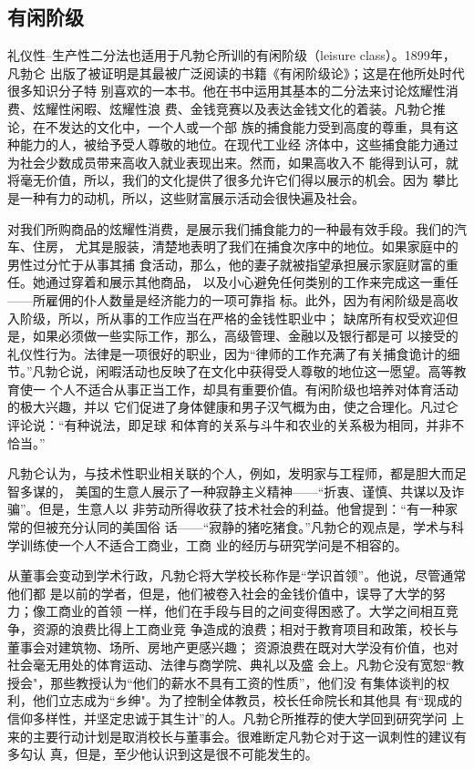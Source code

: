 \subsection{有闲阶级}

礼仪性--生产性二分法也适用于凡勃仑所训的有闲阶级（leisure class）。1899年，凡勃仑
出版了被证明是其最被广泛阅读的书籍《有闲阶级论》；这是在他所处时代很多知识分子特
别喜欢的一本书。他在书中运用其基本的二分法来讨论炫耀性消费、炫耀性闲暇、炫耀性浪
费、金钱竞赛以及表达金钱文化的着装。凡勃仑推论，在不发达的文化中，一个人或一个部
族的捕食能力受到高度的尊重，具有这种能力的人，被给予受人尊敬的地位。在现代工业经
济体中，这些捕食能力通过为社会少数成员带来高收入就业表现出来。然而，如果高收入不
能得到认可，就将毫无价值，所以，我们的文化提供了很多允许它们得以展示的机会。因为
攀比是一种有力的动机，所以，这些财富展示活动会很快遍及社会。

对我们所购商品的炫耀性消费，是展示我们捕食能力的一种最有效手段。我们的汽车、住房，
尤其是服装，清楚地表明了我们在捕食次序中的地位。如果家庭中的男性过分忙于从事其捕
食活动，那么，他的妻子就被指望承担展示家庭财富的重任。她通过穿着和展示其他商品，
以及小心避免任何类别的工作来完成这一重任——所雇佣的仆人数量是经济能力的一项可靠指
标。此外，因为有闲阶级是高收入阶级，所以，所从事的工作应当在严格的金钱性职业中；
缺席所有权受欢迎但是，如果必须做一些实际工作，那么，高级管理、金融以及银行都是可
以接受的礼仪性行为。法律是一项很好的职业，因为“律师的工作充满了有关捕食诡计的细
节。”凡勃仑说，闲暇活动也反映了在文化中获得受人尊敬的地位这一愿望。高等教育使一
个人不适合从事正当工作，却具有重要价值。有闲阶级也培养对体育活动的极大兴趣，并以
它们促进了身体健康和男子汉气概为由，使之合理化。凡过仑评论说：“有种说法，即足球
和体育的关系与斗牛和农业的关系极为相同，并非不恰当。”

凡勃仑认为，与技术性职业相关联的个人，例如，发明家与工程师，都是胆大而足智多谋的，
美国的生意人展示了一种寂静主义精神——“折衷、谨慎、共谋以及诈骗”。但是，生意人以
非劳动所得收获了技术社会的利益。他曾提到：“有一种家常的但被充分认同的美国俗
话——“寂静的猪吃猪食。”凡勃仑的观点是，学术与科学训练使一个人不适合工商业，工商
业的经历与研究学问是不相容的。

从董事会变动到学术行政，凡勃仑将大学校长称作是“学识首领”。他说，尽管通常他们都
是以前的学者，但是，他们被卷入社会的金钱价值中，误导了大学的努力；像工商业的首领
一样，他们在手段与目的之间变得困惑了。大学之间相互竞争，资源的浪费比得上工商业竞
争造成的浪费；相对于教育项目和政策，校长与董事会对建筑物、场所、房地产更感兴趣；
资源浪费在既对大学没有价值，也对社会毫无用处的体育运动、法律与商学院、典礼以及盛
会上。凡勃仑没有宽恕“教授会"，那些教授认为“他们的薪水不具有工资的性质”，他们没
有集体谈判的权利，他们立志成为“乡绅"。为了控制全体教员，校长任命院长和其他具
有“现成的信仰多样性，并坚定忠诚于其生计”的人。凡勃仑所推荐的使大学回到研究学问
上来的主要行动计划是取消校长与董事会。很难断定凡勃仑对于这一讽刺性的建议有多勾认
真，但是，至少他认识到这是很不可能发生的。


